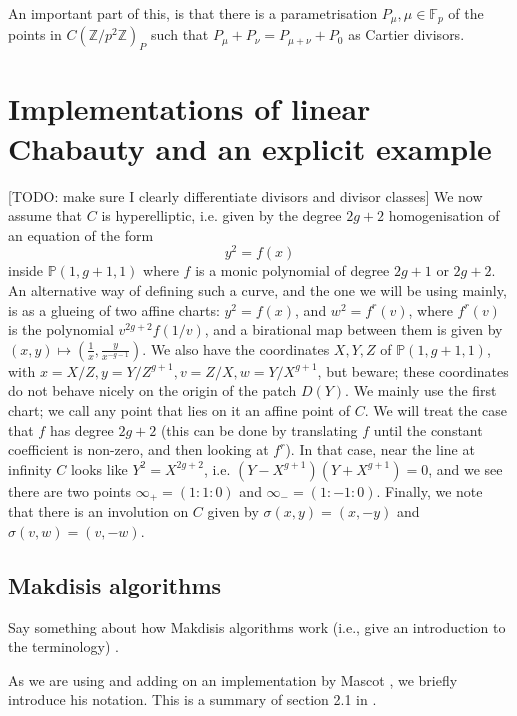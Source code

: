 \documentclass{article}
\newcommand{\Z}{\mathbb{Z}}
\renewcommand{\P}{\mathbb{P}}
\newcommand{\F}{\mathbb{F}}
\theoremstyle{plain}
\theoremstyle{definition}
\theoremstyle{remark}
\begin{document}
An important part of this, is that there is a parametrisation $P_\mu, \mu \in \F_p$ of the points in $C(\Z/p^2\Z)_P$ such that $P_\mu + P_\nu = P_{\mu + \nu} + P_0$ as Cartier divisors.

\section{Implementations of linear Chabauty and an explicit example}
[TODO: make sure I clearly differentiate divisors and divisor classes]
We now assume that $C$ is hyperelliptic, i.e. given by the degree $2g+2$ homogenisation of an equation of the form
\[
y^2 = f(x)
\]
inside $\P(1,g+1,1)$ where $f$ is a monic polynomial of degree $2g+1$ or $2g+2$. An alternative way of defining such a curve, and the one we will be using mainly, is as a glueing of two affine charts: $y^2 = f(x)$, and $w^2 = f^{r}(v)$, where $f^{r}(v)$ is the polynomial $v^{2g + 2} f(1/v)$, and a birational map between them is given by $(x,y) \mapsto (\frac{1}{x},\frac{y}{x^{-g-1}})$. We also have the coordinates $X,Y,Z$ of $\P(1,g+1,1)$, with $x = X/Z, y = Y/Z^{g+1}, v = Z/X, w = Y/X^{g+1}$, but beware; these coordinates do not behave nicely on the origin of the patch $D(Y)$. We mainly use the first chart; we call any point that lies on it an affine point of $C$. We will treat the case that $f$ has degree $2g+2$ (this can be done by translating $f$ until the constant coefficient is non-zero, and then looking at $f^r$). In that case, near the line at infinity $C$ looks like $Y^2 = X^{2g+2}$, i.e. $(Y-X^{g+1})(Y+X^{g+1}) = 0$, and we see there are two points $\infty_+ = (1:1:0)$ and $\infty_- = (1:-1:0)$. Finally, we note that there is an involution on $C$ given by $\sigma(x,y) = (x,-y)$ and $\sigma(v,w) = (v,-w)$.

\subsection{Makdisis algorithms}
Say something about how Makdisis algorithms work (i.e., give an introduction to the terminology) \cite{makdisi2004}.

As we are using and adding on an implementation by Mascot \cite{mascot2018}, we briefly introduce his notation. This is a summary of section 2.1 in \cite{mascot2018}.
\end{document}
